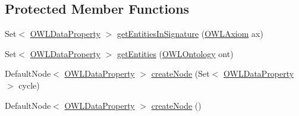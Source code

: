 \subsection*{Protected Member Functions}
\begin{DoxyCompactItemize}
\item 
Set$<$ \hyperlink{interfaceorg_1_1semanticweb_1_1owlapi_1_1model_1_1_o_w_l_data_property}{O\-W\-L\-Data\-Property} $>$ \hyperlink{classorg_1_1semanticweb_1_1owlapi_1_1reasoner_1_1structural_1_1_structural_reasoner_1_1_data_property_hierarchy_info_a5c1e49f19115bf089dfa37db88a224a8}{get\-Entities\-In\-Signature} (\hyperlink{interfaceorg_1_1semanticweb_1_1owlapi_1_1model_1_1_o_w_l_axiom}{O\-W\-L\-Axiom} ax)
\item 
Set$<$ \hyperlink{interfaceorg_1_1semanticweb_1_1owlapi_1_1model_1_1_o_w_l_data_property}{O\-W\-L\-Data\-Property} $>$ \hyperlink{classorg_1_1semanticweb_1_1owlapi_1_1reasoner_1_1structural_1_1_structural_reasoner_1_1_data_property_hierarchy_info_aa50dfb70187dee5a7115f6e40811bb86}{get\-Entities} (\hyperlink{interfaceorg_1_1semanticweb_1_1owlapi_1_1model_1_1_o_w_l_ontology}{O\-W\-L\-Ontology} ont)
\item 
Default\-Node$<$ \hyperlink{interfaceorg_1_1semanticweb_1_1owlapi_1_1model_1_1_o_w_l_data_property}{O\-W\-L\-Data\-Property} $>$ \hyperlink{classorg_1_1semanticweb_1_1owlapi_1_1reasoner_1_1structural_1_1_structural_reasoner_1_1_data_property_hierarchy_info_a5a19bf3da43c5f2ff23e4d79a11a4146}{create\-Node} (Set$<$ \hyperlink{interfaceorg_1_1semanticweb_1_1owlapi_1_1model_1_1_o_w_l_data_property}{O\-W\-L\-Data\-Property} $>$ cycle)
\item 
Default\-Node$<$ \hyperlink{interfaceorg_1_1semanticweb_1_1owlapi_1_1model_1_1_o_w_l_data_property}{O\-W\-L\-Data\-Property} $>$ \hyperlink{classorg_1_1semanticweb_1_1owlapi_1_1reasoner_1_1structural_1_1_structural_reasoner_1_1_data_property_hierarchy_info_a638962240f438c3f20b135f4c6df953a}{create\-Node} ()
\end{DoxyCompactItemize}


